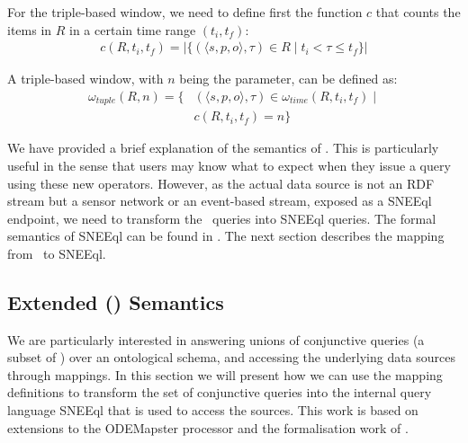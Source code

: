 
For the triple-based window, we need to define first the function $c$ that counts the items in $R$ in a certain time range $(t_{i},t_{f})$:
\begin{align*}
c(R,t_{i},t_{f})=|\{(\langle s,p,o \rangle,\tau) \in R \mid t_{i} < \tau \leq t_{f}\}|
\end{align*}

A triple-based window, with $n$ being the  parameter, can be defined as:
\begin{align*}
\omega_{tuple}(R,n)=\{ & (\langle s,p,o \rangle,\tau) \in \omega_{time}(R,t_{i},t_{f}) \mid \\
& c(R,t_{i},t_{f})=n \}
\end{align*}

We have provided a brief explanation of the semantics of \sparqlstr. This is particularly useful in the sense that users may know what to expect when they issue a query using these new operators. However, as the actual data source is not an RDF stream but a sensor network or an event-based stream, exposed as a SNEEql endpoint, we need to transform the \sparqlstr\ queries into SNEEql queries. The formal semantics of SNEEql can be found in \cite{Brenninkmeijer_08}.
The next section describes the mapping from \sparqlstr\ to SNEEql.




\subsection{Extended \textbf{\rtwoo (\stwoo)} Semantics}
\label{mappingsemantics}

We are particularly interested in answering unions of conjunctive queries (a subset of \sparqlstr) over an ontological
schema, and accessing the underlying data sources \linebreak  through mappings. In this section we will present how we can use the
mapping definitions to transform the set of conjunctive queries into the internal query language SNEEql that is used to
access the sources. This work is based on extensions to the ODEMapster processor \cite{Barrasa_04} and the
formalisation work of \cite{Calvanese_05,Poggi_08}.


